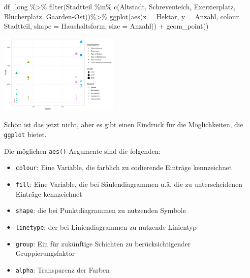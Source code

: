 \documentclass[
]{book}
\newenvironment{Shaded}{\begin{snugshade}}{\end{snugshade}}
\newcommand{\AttributeTok}[1]{\textcolor[rgb]{0.77,0.63,0.00}{#1}}
\newcommand{\FunctionTok}[1]{\textcolor[rgb]{0.00,0.00,0.00}{#1}}
\newcommand{\NormalTok}[1]{#1}
\newcommand{\SpecialCharTok}[1]{\textcolor[rgb]{0.00,0.00,0.00}{#1}}
\newcommand{\StringTok}[1]{\textcolor[rgb]{0.31,0.60,0.02}{#1}}
\providecommand{\tightlist}{%
  \setlength{\itemsep}{0pt}\setlength{\parskip}{0pt}}
\begin{document}
\begin{Shaded}
\begin{Highlighting}[]
\NormalTok{df\_long }\SpecialCharTok{\%\textgreater{}\%} 
  \FunctionTok{filter}\NormalTok{(Stadtteil }\SpecialCharTok{\%in\%} \FunctionTok{c}\NormalTok{(}\StringTok{\textquotesingle{}Altstadt\textquotesingle{}}\NormalTok{, }
                          \StringTok{\textquotesingle{}Schreventeich\textquotesingle{}}\NormalTok{, }
                          \StringTok{\textquotesingle{}Exerzierplatz\textquotesingle{}}\NormalTok{, }
                          \StringTok{\textquotesingle{}Blücherplatz\textquotesingle{}}\NormalTok{,}
                          \StringTok{\textquotesingle{}Gaarden{-}Ost\textquotesingle{}}\NormalTok{))}\SpecialCharTok{\%\textgreater{}\%} 
  \FunctionTok{ggplot}\NormalTok{(}\FunctionTok{aes}\NormalTok{(}\AttributeTok{x =}\NormalTok{ Hektar,}
             \AttributeTok{y =}\NormalTok{ Anzahl,}
             \AttributeTok{colour =}\NormalTok{ Stadtteil,}
             \AttributeTok{shape =}\NormalTok{ Haushaltsform,}
             \AttributeTok{size =}\NormalTok{ Anzahl)) }\SpecialCharTok{+}
  \FunctionTok{geom\_point}\NormalTok{()}
\end{Highlighting}
\end{Shaded}

\begin{center}\includegraphics[width=166.666666666667pt]{imgs/point_aes} \end{center}

Schön ist das jetzt nicht, aber es gibt einen Eindruck für die Möglichkeiten, die \texttt{ggplot} bietet.

Die möglichen \texttt{aes()}-Argumente sind die folgenden:

\begin{itemize}
\tightlist
\item
  \texttt{colour}: Eine Variable, die farblich zu codierende Einträge kennzeichnet
\item
  \texttt{fill}: Eine Variable, die bei Säulendiagrammen u.ä. die zu unterscheidenen Einträge kennzeichnet
\item
  \texttt{shape}: die bei Punktdiagrammen zu nutzenden Symbole
\item
  \texttt{linetype}: der bei Liniendiagrammen zu nutzende Linientyp
\item
  \texttt{group}: Ein für zukünftige Schichten zu berücksichtigender Gruppierungsfaktor
\item
  \texttt{alpha}: Transparenz der Farben
\end{itemize}
\end{document}

